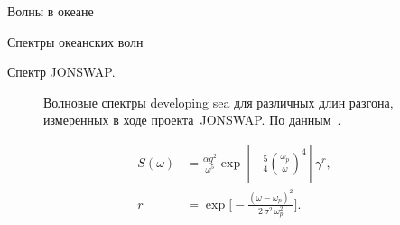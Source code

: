 \begin{chapter}{Волны в океане}
\begin{section}{Спектры океанских волн}
\begin{paragraph}{Спектр JONSWAP.}
\begin{figure}[t!]
\caption{Волновые спектры developing sea для различных длин разгона,
измеренных в ходе проекта~JONSWAP. По данным~\cite{Hasselmann:1973}.}
\label{fig:hasselmannspect}
\end{figure}
%
%
%

\begin{subequations}\label{eq:16.34}
\begin{align}
 S(\omega) &= \frac{\alpha g^{2}}{\omega ^{5}} 
              \exp \left[ - \frac{5}{4}\left(\frac{\omega _{p}}{\omega } \right) ^{4} \right] \gamma ^{r}, \\
         r &= \exp \biggl[ - \frac{\left(\omega - \omega _{p}\right)^{2}}{2\, \sigma ^{2} \,\omega _{p}^{2}}\biggr].
\end{align}
\end{subequations}


\end{paragraph}
\end{section}
\end{chapter}
